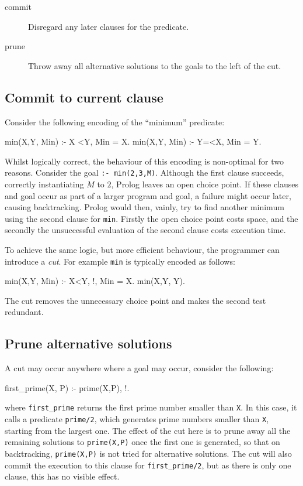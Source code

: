 \begin{description}
\item[commit] Disregard any later clauses for the predicate.
\item[prune] Throw away all alternative solutions to the goals to the left of
 the cut.
\end{description}

\subsection{Commit to current clause}

Consider the following encoding of the ``minimum'' predicate:
\begin{code}
min(X,Y, Min) :- X <Y, Min = X.
min(X,Y, Min) :- Y=<X, Min = Y.
\end{code}
Whilst logically correct, the behaviour of this encoding is
non-optimal for two reasons.  Consider the goal {\tt :- min(2,3,M)}.
Although the first clause succeeds, correctly instantiating $M$ to
$2$, Prolog leaves an open choice point.  If these clauses and goal
occur as part of a larger program and goal, a failure might occur
later, causing backtracking. 
Prolog would then, vainly, try to find another minimum using the
second clause for {\tt min}. 
Firstly the open choice point costs space, and the secondly the
unsuccessful evaluation of the second clause costs execution time.

To achieve the same logic, but more efficient behaviour, the
programmer can introduce a {\it cut}.
For example {\tt min} is typically encoded as follows:
\begin{code}
min(X,Y, Min) :- X<Y, !, Min = X.
min(X,Y, Y).
\end{code}
The cut removes the unnecessary choice point and makes the second test redundant.

  \subsection{Prune alternative solutions}
A cut may occur anywhere where a goal may occur, consider the following:
\begin{code}
first_prime(X, P) :-
    prime(X,P), !.
\end{code}
where \verb'first_prime' returns the first prime number smaller than \verb'X'.
In this case, it calls a predicate \verb'prime/2', which generates prime
numbers smaller than \verb'X', starting from the largest one. The effect of
the cut here is to prune away all the remaining solutions to \verb'prime(X,P)'
once the first one is generated, so that on backtracking, \verb'prime(X,P)'
is not tried for alternative solutions. The cut will also commit the execution
to this clause for \verb'first_prime/2', but as there is only one clause,
this has no visible effect.


